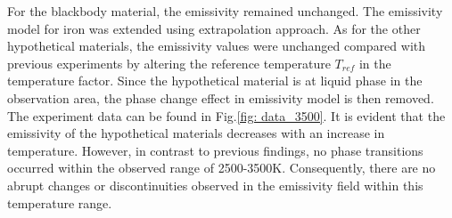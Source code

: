 For the blackbody material, the emissivity remained unchanged. The emissivity model for iron was 
extended using extrapolation approach. As for the other hypothetical materials, the emissivity 
values were unchanged compared with previous experiments by altering the reference 
temperature $T_{ref}$ in the temperature factor. Since the hypothetical material is at liquid phase 
in the observation area, the phase change effect in emissivity model is then removed. The experiment data 
can be found in Fig.\ref{fig: data_3500}. It is evident that the emissivity of the hypothetical 
materials decreases with an increase in temperature. However, in contrast to 
previous findings, no phase transitions occurred within the observed range of 2500-3500K.
Consequently, there are no abrupt changes or discontinuities observed in the emissivity 
field within this temperature range.

